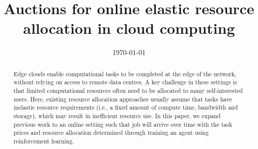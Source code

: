 \documentclass[sotoncolour]{uosproject}     %
\title       {Auctions for online elastic resource allocation in cloud computing}
\date       {\today}
\begin{document}
\frontmatter
\maketitle
\begin{abstract}
Edge clouds enable computational tasks to be completed at the edge of the network, without relying on access to remote
data centres. A key challenge in these settings is that limited computational resources often need to be allocated to
many self-interested users. Here, existing resource allocation approaches usually assume that tasks have inelastic
resource requirements (i.e., a fixed amount of compute time, bandwidth and storage), which may result in inefficient
resource use. In this paper, we expand previous work to an online setting such that job will arrive over time with the
task prices and resource allocation determined through training an agent using reinforcement learning.
\end{abstract}
\tableofcontents

\end{document}
